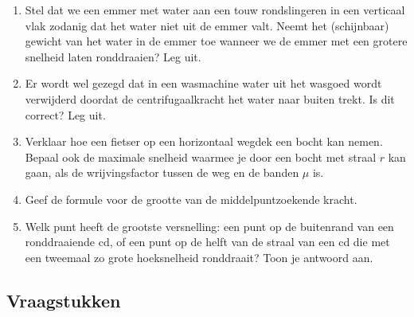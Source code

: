 \begin{enumerate}
\item Stel dat we een emmer met water aan een touw rondslingeren in een verticaal vlak zodanig dat het water niet uit de emmer valt. Neemt het (schijnbaar) gewicht van het water in de emmer toe wanneer we de emmer met een grotere snelheid laten ronddraaien? Leg uit.

\item Er wordt wel gezegd dat in een wasmachine water uit het wasgoed wordt verwijderd doordat de centrifugaalkracht het water naar buiten trekt. Is dit correct? Leg uit.

\item Verklaar hoe een fietser op een horizontaal wegdek een bocht kan nemen. Bepaal ook de maximale snelheid waarmee je door een bocht met straal $r$ kan gaan, als de wrijvingsfactor tussen de weg en de banden $\mu$ is.

\item Geef de formule voor de grootte van de middelpuntzoekende kracht.

\item Welk punt heeft de grootste versnelling: een punt op de buitenrand
van een ronddraaiende cd, of een punt op de helft van de straal van
een cd die met een tweemaal zo grote hoeksnelheid ronddraait? Toon
je antwoord aan.

\end{enumerate}





\subsection{Vraagstukken}

